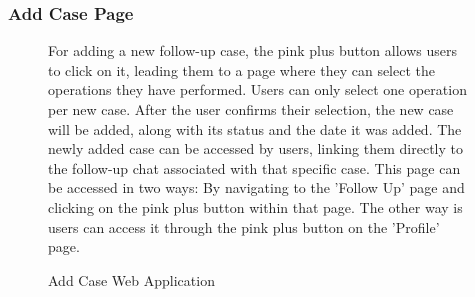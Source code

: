 \documentclass[12pt,oneside,openright,a4paper]{cpe-english-project}
\begin{document}
        \subsubsection{Add Case Page}
          \begin{figure}[H]
            \centering
            \begin{minipage}{.5\textwidth}
              \centering
            \end{minipage}%
            \begin{minipage}{.5\textwidth}
              \centering
            \end{minipage}%
          
            \caption{Add Case Web Application}\label{fig:WebAppAddCase}
            \begin{justify}
              \qquad For adding a new follow-up case, the pink plus button allows users to click on it, leading them to a page where they can select the operations they have performed. Users can only select one operation per new case. After the user confirms their selection, the new case will be added, along with its status and the date it was added. The newly added case can be accessed by users, linking them directly to the follow-up chat associated with that specific case.
              This page can be accessed in two ways: By navigating to the 'Follow Up' page and clicking on the pink plus button within that page. The other way is users can access it through the pink plus button on the 'Profile' page.\par
            \end{justify}
          \end{figure}
  
\end{document}
